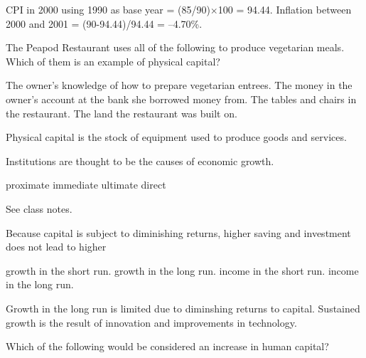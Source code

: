 \documentclass[addpoints,11pt]{exam}
\theoremstyle{definition}
\newcommand{\blank}[0]{\underline{\hspace{3cm}}}
\begin{document}
\begin{questions}
			\begin{solution}
				CPI in 2000 using 1990 as base year = (85/90)$\times$100 = 94.44. Inflation between 2000 and 2001 = (90-94.44)/94.44 = --4.70\%.
			\end{solution}
			
			\question The Peapod Restaurant uses all of the following to produce vegetarian meals. Which of
			them is an example of physical capital?
			
			\begin{choices}
				\choice The owner's knowledge of how to prepare vegetarian entrees.
				\choice The money in the owner's account at the bank she borrowed money from.
				\CorrectChoice The tables and chairs in the restaurant.
				\choice The land the restaurant was built on.
			\end{choices}
			
			\begin{solution}
				Physical capital is the stock of equipment used to produce goods and services.
			\end{solution}
			
			\question Institutions are thought to be the \blank causes of economic growth.
			
			\begin{choices}
				\choice proximate 
				\choice immediate 
				\CorrectChoice ultimate
				\choice direct
			\end{choices}
			
			\begin{solution}
				See class notes.
			\end{solution}
		
			
			\question Because capital is subject to diminishing returns, higher saving and investment does not lead to higher
			
			\begin{choices}
				\choice growth in the short run.
				\CorrectChoice growth in the long run.
				\choice income in the short run.
				\choice income in the long run.
			\end{choices}
			
			\begin{solution}
				Growth in the long run is limited due to diminshing returns to capital. Sustained growth is the result of innovation and improvements in technology.
			\end{solution}

			
			\question Which of the following would be considered an increase in human capital?
			

\end{questions}
\end{document}
